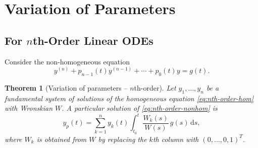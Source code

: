 \documentclass[12pt,a4paper,openany]{book}
\theoremstyle{definition}
\theoremstyle{plain}
\newtheorem{theorem}[definition]{Theorem}
\theoremstyle{remark}
\newcommand{\dd}{\mathrm{d}}
\begin{document}
\section{Variation of Parameters}\label{sec:var-params}

\subsection{For $n$th-Order Linear ODEs}\label{subsec:var-params-nth}

Consider the non-homogeneous equation
\begin{equation}\label{eq:nth-order-nonhom}
  y^{(n)} + p_{n-1}(t)y^{(n-1)} + \cdots + p_0(t)y = g(t).
\end{equation}

\begin{theorem}[Variation of parameters -- $n$th-order]\label{thm:var-params-nth}
Let $y_1,\dots,y_n$ be a fundamental system of solutions of the
homogeneous equation \eqref{eq:nth-order-hom} with Wronskian $W$.
A particular solution of \eqref{eq:nth-order-nonhom} is
\begin{equation}\label{eq:var-params-nth}
  y_p(t) = \sum_{k=1}^{n} y_k(t)\int_{t_0}^{t}
    \frac{W_k(s)}{W(s)}\,g(s)\,\dd s,
\end{equation}
where $W_k$ is obtained from $W$ by replacing the $k$th column with
$(0,\dots,0,1)^T$.
\end{theorem}
\end{document}
